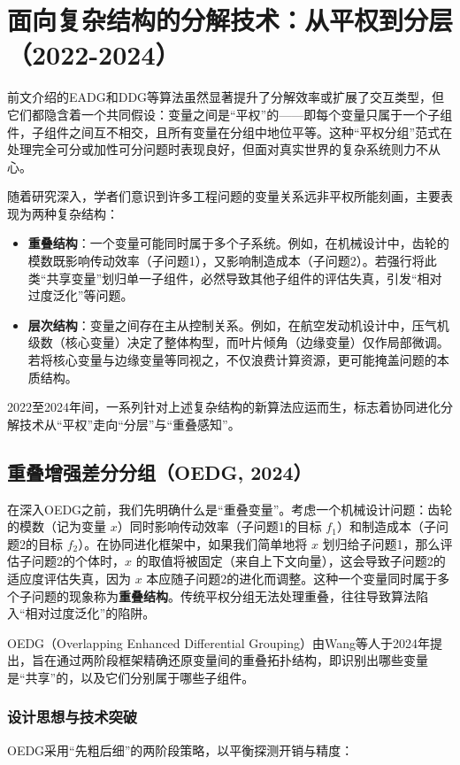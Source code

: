 \section{面向复杂结构的分解技术：从平权到分层（2022-2024）}

前文介绍的EADG和DDG等算法虽然显著提升了分解效率或扩展了交互类型，但它们都隐含着一个共同假设：变量之间是“平权”的——即每个变量只属于一个子组件，子组件之间互不相交，且所有变量在分组中地位平等。这种“平权分组”范式在处理完全可分或加性可分问题时表现良好，但面对真实世界的复杂系统则力不从心。

随着研究深入，学者们意识到许多工程问题的变量关系远非平权所能刻画，主要表现为两种复杂结构：
\begin{itemize}
    \item \textbf{重叠结构}：一个变量可能同时属于多个子系统。例如，在机械设计中，齿轮的模数既影响传动效率（子问题1），又影响制造成本（子问题2）。若强行将此类“共享变量”划归单一子组件，必然导致其他子组件的评估失真，引发“相对过度泛化”等问题。
    \item \textbf{层次结构}：变量之间存在主从控制关系。例如，在航空发动机设计中，压气机级数（核心变量）决定了整体构型，而叶片倾角（边缘变量）仅作局部微调。若将核心变量与边缘变量等同视之，不仅浪费计算资源，更可能掩盖问题的本质结构。
\end{itemize}
2022至2024年间，一系列针对上述复杂结构的新算法应运而生，标志着协同进化分解技术从“平权”走向“分层”与“重叠感知”。

\subsection{重叠增强差分分组（OEDG, 2024）}

在深入OEDG之前，我们先明确什么是“重叠变量”。考虑一个机械设计问题：齿轮的模数（记为变量 $x$）同时影响传动效率（子问题1的目标 $f_1$）和制造成本（子问题2的目标 $f_2$）。在协同进化框架中，如果我们简单地将 $x$ 划归给子问题1，那么评估子问题2的个体时，$x$ 的取值将被固定（来自上下文向量），这会导致子问题2的适应度评估失真，因为 $x$ 本应随子问题2的进化而调整。这种一个变量同时属于多个子问题的现象称为\textbf{重叠结构}。传统平权分组无法处理重叠，往往导致算法陷入“相对过度泛化”的陷阱。

OEDG（Overlapping Enhanced Differential Grouping）由Wang等人于2024年提出，旨在通过两阶段框架精确还原变量间的重叠拓扑结构，即识别出哪些变量是“共享”的，以及它们分别属于哪些子组件。

\subsubsection{设计思想与技术突破}
OEDG采用“先粗后细”的两阶段策略，以平衡探测开销与精度：

